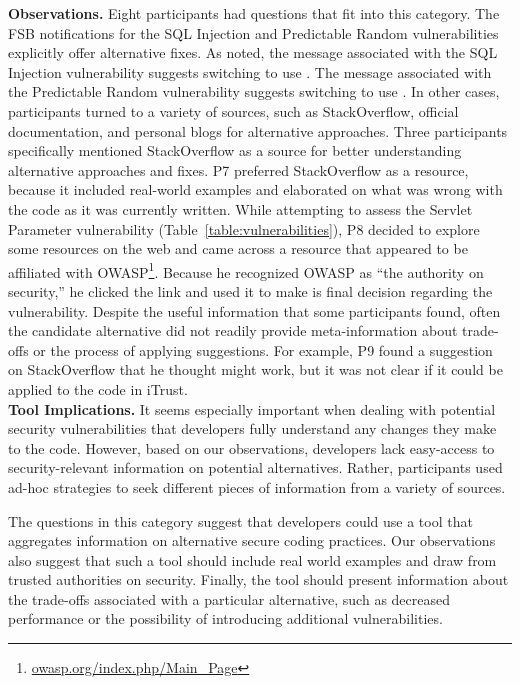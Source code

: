 \documentclass[conference]{IEEEtran}
\begin{document}
\noindent\textbf{Observations.}
Eight participants had questions that fit into this category. 
The FSB notifications for the SQL Injection and Predictable Random vulnerabilities explicitly offer alternative fixes. 
As noted, the message associated with the SQL Injection vulnerability suggests switching to use . 
The message associated with the Predictable Random vulnerability suggests switching to use . 
In other cases, participants turned to a variety of sources, such as StackOverflow, official documentation, and personal blogs for alternative approaches. 
Three participants specifically mentioned StackOverflow as a source for better understanding alternative approaches and fixes. 
P7 preferred StackOverflow as a resource, because it included real-world examples and elaborated on what was wrong with the code as it was currently written.  
While attempting to assess the Servlet Parameter vulnerability (Table~\ref{table:vulnerabilities}), P8 decided to explore some resources on the web and came across a resource that appeared to be affiliated with OWASP\footnote{\url{owasp.org/index.php/Main_Page}}. 
Because he recognized OWASP as ``the authority on security,'' he clicked the link and used it to make is final decision regarding the vulnerability. 
Despite the useful information that some participants found, often the candidate alternative did not readily provide meta-information about trade-offs or the process of applying suggestions. 
For example, P9 found a suggestion on StackOverflow that he thought might work, but it was not clear if it could be applied to the code in iTrust. 
\\

\noindent\textbf{Tool Implications.} 
It seems especially important when dealing with potential security vulnerabilities that developers fully understand any changes they make to the code. 
However, based on our observations, developers lack easy-access to security-relevant information on potential alternatives. 
Rather, participants used ad-hoc strategies to seek different pieces of information from a variety of sources. 

The questions in this category suggest that developers could use a tool that aggregates information on alternative secure coding practices.
Our observations also suggest that such a tool should include real world examples and draw from trusted authorities on security.
Finally, the tool should present information about the trade-offs associated with a particular alternative, such as decreased performance or the possibility of introducing additional vulnerabilities. 
\end{document}
